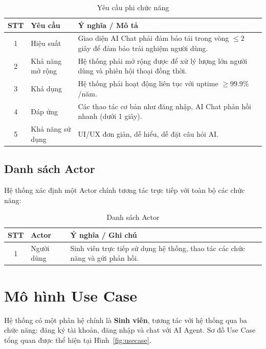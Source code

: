 \begin{table}[H]
	\centering
	\renewcommand{\arraystretch}{1.5}
	\caption{Yêu cầu phi chức năng}
	\label{tab:yc_phi_cn}
	\begin{tabular}{|c|l|p{9cm}|}
		\hline
		\textbf{STT} & \textbf{Yêu cầu} & \textbf{Ý nghĩa / Mô tả} \\
		\hline
		1 & Hiệu suất & Giao diện AI Chat phải đảm bảo tải trong vòng $\leq 2$ giây để đảm bảo trải nghiệm người dùng. \\
		\hline
		2 & Khả năng mở rộng & Hệ thống phải mở rộng được để xử lý lượng lớn người dùng và phiên hội thoại đồng thời. \\
		\hline
		3 & Khả dụng & Hệ thống phải hoạt động liên tục với uptime $\geq 99.9\%$/năm. \\
		\hline
		4 & Đáp ứng & Các thao tác cơ bản như đăng nhập, AI Chat phản hồi nhanh (dưới 1 giây). \\
		\hline
		5 & Khả năng sử dụng & UI/UX đơn giản, dễ hiểu, dễ đặt câu hỏi AI. \\
		\hline
	\end{tabular}
\end{table}

\subsection{Danh sách Actor}

Hệ thống xác định một Actor chính tương tác trực tiếp với toàn bộ các chức năng:

\begin{table}[H]
	\centering
	\renewcommand{\arraystretch}{1.5}
	\caption{Danh sách Actor}
	\label{tab:actor}
	\begin{tabular}{|c|l|p{9cm}|}
		\hline
		\textbf{STT} & \textbf{Actor} & \textbf{Ý nghĩa / Ghi chú} \\
		\hline
		1 & Người dùng & Sinh viên trực tiếp sử dụng hệ thống, thao tác các chức năng và gửi phản hồi. \\
		\hline
	\end{tabular}
\end{table}

\section{Mô hình Use Case}

Hệ thống có một phân hệ chính là \textbf{Sinh viên}, tương tác với hệ thống qua ba chức năng: đăng ký tài khoản, đăng nhập và chat với AI Agent. Sơ đồ Use Case tổng quan được thể hiện tại Hình~\ref{fig:usecase}.

